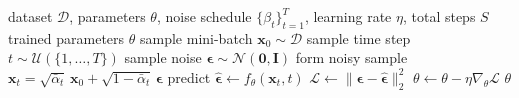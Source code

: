 %
%

\begin{algorithm}
\caption{Denoising diffusion training step}
\label{alg:diffusion-train}
\begin{algorithmic}[1]
\Require dataset $\mathcal{D}$, parameters $\theta$, noise schedule $\{\beta_t\}_{t=1}^T$,
         learning rate $\eta$, total steps $S$
\Ensure  trained parameters $\theta$
  \State sample mini-batch $\mathbf{x}_0 \sim \mathcal{D}$
  \State sample time step $t \sim \mathcal{U}(\{1, \dots, T\})$
  \State sample noise $\boldsymbol{\epsilon} \sim \mathcal{N}(\mathbf{0}, \mathbf{I})$
  \State form noisy sample $\mathbf{x}_t = \sqrt{\bar{\alpha}_t}\, \mathbf{x}_0
                                              + \sqrt{1 - \bar{\alpha}_t}\, \boldsymbol{\epsilon}$
  \State predict $\hat{\boldsymbol{\epsilon}} \leftarrow f_\theta(\mathbf{x}_t, t)$
  \State $\mathcal{L} \leftarrow \|\boldsymbol{\epsilon} - \hat{\boldsymbol{\epsilon}}\|_2^2$
  \State $\theta \leftarrow \theta - \eta \nabla_\theta \mathcal{L}$
\EndFor
\State \Return $\theta$
\end{algorithmic}
\end{algorithm}
